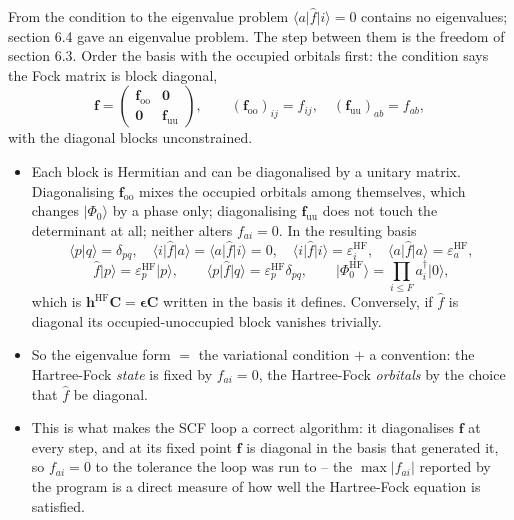 \documentclass[aspectratio=169,10pt]{beamer}
\newcommand{\ket}[1]{\vert #1\rangle}
\newcommand{\braket}[2]{\langle #1\vert #2\rangle}
\newcommand{\element}[3]{\langle #1\vert #2\vert #3\rangle}
\begin{document}
\begin{frame}{From the condition to the eigenvalue problem}
  \footnotesize
  $\element{a}{\hat{f}}{i}=0$ contains no eigenvalues; section 6.4 gave an eigenvalue problem. The step between them is the freedom of section 6.3. Order the basis with the occupied orbitals first: the condition says the Fock matrix is \alert{block diagonal},
  \[
    \bm{f}=\begin{pmatrix}\bm{f}_{\mathrm{oo}} & \bm{0}\\ \bm{0} & \bm{f}_{\mathrm{uu}}\end{pmatrix},
    \qquad(\bm{f}_{\mathrm{oo}})_{ij}=f_{ij},\quad(\bm{f}_{\mathrm{uu}})_{ab}=f_{ab},
  \]
  with the diagonal blocks unconstrained.
  \begin{itemize}
    \item Each block is Hermitian and can be diagonalised by a unitary matrix. Diagonalising $\bm{f}_{\mathrm{oo}}$ mixes the occupied orbitals among themselves, which changes $\ket{\Phi_0}$ by a phase only; diagonalising $\bm{f}_{\mathrm{uu}}$ does not touch the determinant at all; neither alters $f_{ai}=0$. In the resulting basis
    \[
      \braket{p}{q}=\delta_{pq},\quad\element{i}{\hat{f}}{a}=\element{a}{\hat{f}}{i}=0,\quad\element{i}{\hat{f}}{i}=\varepsilon_i^{\mathrm{HF}},\quad\element{a}{\hat{f}}{a}=\varepsilon_a^{\mathrm{HF}},
    \]
    \[
      \hat{f}\ket{p}=\varepsilon_p^{\mathrm{HF}}\ket{p},\qquad\element{p}{\hat{f}}{q}=\varepsilon_p^{\mathrm{HF}}\delta_{pq},\qquad\ket{\Phi_0^{\mathrm{HF}}}=\prod_{i\le F}a_i^{\dagger}\ket{0},
    \]
    which is $\bm{h}^{\mathrm{HF}}\bm{C}=\bm{\epsilon}\bm{C}$ written in the basis it defines. Conversely, if $\hat{f}$ is diagonal its occupied-unoccupied block vanishes trivially.
    \item So the eigenvalue form $=$ the variational condition $+$ a convention: \alert{the Hartree-Fock \emph{state} is fixed by $f_{ai}=0$, the Hartree-Fock \emph{orbitals} by the choice that $\hat{f}$ be diagonal.}
    \item This is what makes the SCF loop a correct algorithm: it diagonalises $\bm{f}$ at every step, and at its fixed point $\bm{f}$ is diagonal in the basis that generated it, so $f_{ai}=0$ to the tolerance the loop was run to -- the $\max|f_{ai}|$ reported by the program is a direct measure of how well the Hartree-Fock equation is satisfied.
  \end{itemize}
\end{frame}
\end{document}
